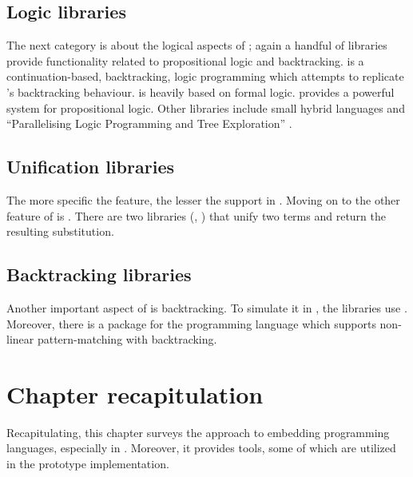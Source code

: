 \documentclass[thesis-solanki.tex]{subfiles}
\begin{document}
\subsection{Logic libraries}

The next category is about the logical aspects of ; again a handful of libraries provide
functionality related to propositional logic and backtracking.
\cite{logict-lib} is a continuation-based, backtracking, logic programming  which attempts
to replicate
's backtracking behaviour.
 is heavily based on formal logic.
\cite{proplogic-lib} provides a powerful system for propositional logic.
Other libraries include small hybrid languages \cite{cflp-lib} and ``Parallelising Logic Programming and Tree
Exploration'' \cite{logic-grows-on-trees-lib}.


\subsection{Unification libraries}

The more specific the feature, the lesser the support in .
Moving on to the other feature of  is .
There are two libraries (\cite{unification-fd-lib}, \cite{cmu-lib}) that unify two  terms and return
the resulting substitution.


\subsection{Backtracking libraries}

Another important aspect of  is backtracking.
To simulate it in , the libraries \cite{stream-monad-lib, logicst-lib} use .
Moreover, there is a package for the  programming language \cite{egison-lib} which supports
non-linear pattern-matching with backtracking.




\section{Chapter recapitulation}
Recapitulating, this chapter surveys the approach to embedding programming languages, especially  in .
Moreover, it provides tools, some of which are utilized in the prototype implementation.   

\ifMain
\begin{scope}
  \nolinenumbers
  \enotesize
  \par
  \begin{singlespace}
  \setlength{\parskip}{12pt plus 2pt minus 1pt}
  \theendnotes
  \par
  \end{singlespace}
\end{scope}
\fi
\end{document}
